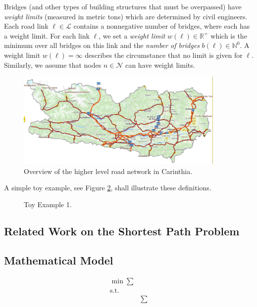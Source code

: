 Bridges (and other types of building structures that must be overpassed)
have \emph{weight limits} (measured in metric tons) which are determined by civil engineers.
Each road link $\ell \in \mathcal{L}$ contains a nonnegative number of bridges, where each has a weight limit.
For each link $\ell$, we set a \emph{weight limit} $w(\ell) \in \mathbb{R}^{+}$ which is the
minimum over all bridges on this link and the \emph{number of bridges} $b(\ell) \in \mathbb{N}^{0}$.
A weight limit $w(\ell)= \infty$ describes the circumstance
that no limit is given for $\ell$.
Similarly, we assume that nodes $n \in \mathcal{N}$ can have weight limits.
\begin{figure}[!ht]
 \centering
  \includegraphics[width=0.9\textwidth]{map.jpg}
  \caption{Overview of the higher level road network in Carinthia.}
  \label{fig:higher level}
\end{figure}


A simple toy example, see Figure \ref{fig_toy_example_1}, shall illustrate these definitions.
\begin{figure}[!ht]
  \centering
  
  \caption{Toy Example 1.}
  \label{fig_toy_example_1}
\end{figure}


\subsection{Related Work on the Shortest Path Problem}

\citet{TACCARI2016122}

\subsection{Mathematical Model}


\begin{align*}
   \min \sum    \\
   \text{s.t.}  &  \\
    & \sum
\end{align*}
